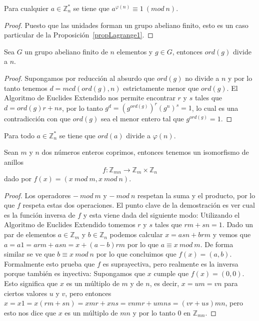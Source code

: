 \begin{theorem}[de Euler]
Para cualquier $a \in {\mathbb Z}_n^*$ se tiene que $a^{\varphi(n)} \equiv 1 ~(mod~n)$.
\end{theorem}
\begin{proof}
Puesto que las unidades forman un grupo abeliano finito, esto es un caso particular
de la Proposici\'on~\ref{propLagrange1}.
\end{proof}

\begin{proposition}
Sea $G$ un grupo abeliano finito de $n$ elementos y $g \in G$, entonces $ord(g)$ divide a $n$.
\end{proposition}
\begin{proof}
Supongamos por reducci\'on al absurdo que $ord(g)$ no divide a $n$ y por lo tanto tenemos $d = mcd(ord(g),n)$ estrictamente menor que $ord(g)$.
El Algoritmo de Euclides Extendido nos permite encontrar $r$ y $s$ tales que $d = ord(g)r+ns$, por lo tanto $g^d = (g^{ord(g)})^r(g^n)^s = 1$, lo cual es una contradicci\'on con
que $ord(g)$ sea el menor entero tal que $g^{ord(g)} = 1$.
\end{proof}

\begin{corollary}
Para todo $a \in {\mathbb Z}_n^*$ se tiene que $ord(a)$ divide a $\varphi(n)$.
\end{corollary}

\begin{theorem} Sean $m$ y $n$ dos n\'umeros enteros
coprimos, entonces tenemos un isomorfismo de anillos
\[ f : {\mathbb Z}_{mn} \to {\mathbb Z}_m \times {\mathbb Z}_n \] dado por
$f(x) = (x~mod~m, x~mod~n)$.
\end{theorem}
\begin{proof}
Los operadores $-~mod~m$ y $-~mod~n$ respetan la suma y el producto, por lo que
$f$ respeta estas dos operaciones. El punto clave de la demostraci\'on es ver cual es
la funci\'on inversa de $f$ y esta viene dada del siguiente modo: Utilizando el Algoritmo
de Euclides Extendido tomemos $r$ y $s$ tales que $rm+sn =1$. Dado un par de elementos
$a \in {\mathbb Z}_m$ y $b \in {\mathbb Z}_n$ podemos calcular $x = asn+brm$ y vemos que
$a = a1 = arm+asn = x + (a-b)rm$ por lo que $a \equiv x~mod~m$. De forma similar se ve
que $b \equiv x~mod~n$ por lo que concluimos que $f(x) = (a,b)$. Formalmente esto prueba que
$f$ es suprayectiva, pero realmente es la inversa porque tambi\'en es inyectiva: Supongamos
que $x$ cumple que $f(x) = (0,0)$. Esto significa que $x$ es un m\'ultiplo de $m$ y de $n$, es
decir, $x = um = vn$ para ciertos valores $u$ y $v$, pero entonces $x = x1 = x(rm+sn) =
xmr + xns = vnmr+umns = (vr+us)mn$, pero esto nos dice que $x$ es un m\'ultiplo de $mn$ y
por lo tanto $0$ en ${\mathbb Z}_{mn}$.
\end{proof}

